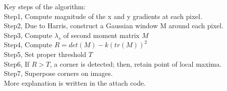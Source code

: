 \documentclass[letterpaper]{article}
\begin{document}
Key steps of the algorithm:\\
Step1, Compute magnitude of the x and y gradients at each pixel.\\
Step2, Due to Harris, construct a Gaussian window M around each pixel.\\
Step3, Compute $\lambda_s$ of second moment matrix $M$ \\
Step4, Compute $R=det(M)-k(tr(M))^2$ \\
Step5, Set proper threshold $T$ \\
Step6, If $R> T$, a corner is detected; then, retain point of local maxima. \\
Step7, Superpose corners on images.\\

More explanation is written in the attach code.\\
\end{document}
